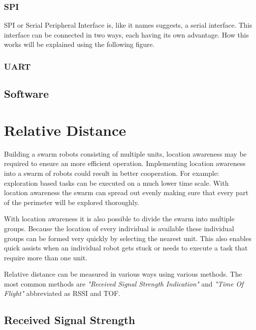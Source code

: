 \documentclass[10pt,a4paper]{article}
\begin{document}
\subsubsection{SPI}
SPI or Serial Peripheral Interface is, like it names suggests, a serial interface. This interface can be connected in two ways, each having its own advantage. How this works will be explained using the following figure.

\subsubsection{UART}
\subsection{Software}


\newpage

\section{Relative Distance}
Building a swarm robots consisting of multiple units, location awareness may be required to ensure an more efficient operation. Implementing location awareness into a swarm of robots could result in better cooperation. For example: exploration based tasks can be executed on a much lower time scale. With location awareness the swarm can spread out evenly making sure that every part of the perimeter will be explored thoroughly. 

With location awareness it is also possible to divide the swarm into multiple groups. Because the location of every individual is available these individual groups can be formed very quickly by selecting the nearest unit. This also enables quick assists when an individual robot gets stuck or needs to execute a task that require more than one unit.

Relative distance can be measured in various ways using various methods. The most common methods are \textit{"Received Signal Strength Indication"} and \textit{"Time Of Flight"} abbreviated as RSSI and TOF. 

\subsection{Received Signal Strength}
\end{document}
